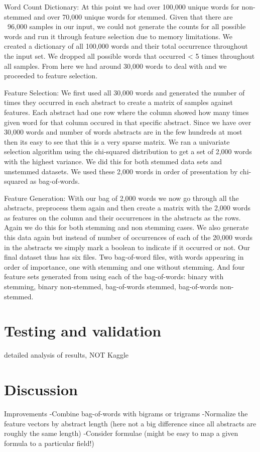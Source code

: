 \documentclass{acm_proc_article-sp}
\begin{document}
Word Count Dictionary: 
At this point we had over 100,000 unique words for non-stemmed and over 70,000 unique words for stemmed. Given that there are ~96,000 samples in our input, we could not generate the counts for all possible words and run it through feature selection due to memory limitations. We created a dictionary of all 100,000 words and their total occurrence throughout the input set. We dropped all possible words that occurred < 5 times throughout all samples. From here we had around 30,000 words to deal with and we proceeded to feature selection. 

Feature Selection: 
We first used all 30,000 words and generated the number of times they occurred in each abstract to create a matrix of samples against features. Each abstract had one row where the column showed how many times given word for that column occured in that specific abstract. Since we have over 30,000 words and number of words abstracts are in the few hundreds at most then its easy to see that this is a very sparse matrix. We ran a univariate selection algorithm using the chi-squared distribution to get a set of 2,000 words with the highest variance. We did this for both stemmed data sets and unstemmed datasets. We used these 2,000 words in order of presentation by chi-squared as bag-of-words. 

Feature Generation: 
With our bag of 2,000 words we now go through all the abstracts, preprocess them again and then create a matrix with the 2,000 words as features on the column and their occurrences in the abstracts as the rows. Again we do this for both stemming and non stemming cases. We also generate this data again but instead of number of occurrences of each of the 20,000 words in the abstracts we simply mark a boolean to indicate if it occurred or not. Our final dataset thus has six files. Two bag-of-word files, with words appearing in order of importance, one with stemming and one without stemming. And four feature sets generated from using each of the bag-of-words: binary with stemming, binary non-stemmed, bag-of-words stemmed, bag-of-words non-stemmed.


\section{Testing and validation}
detailed analysis of results, NOT Kaggle

\section{Discussion}
Improvements
-Combine bag-of-words with bigrams or trigrams
-Normalize the feature vectors by abstract length (here not a big difference since all abstracts are roughly the same length)
-Consider formulae (might be easy to map a given formula to a particular field!)
\end{document}
